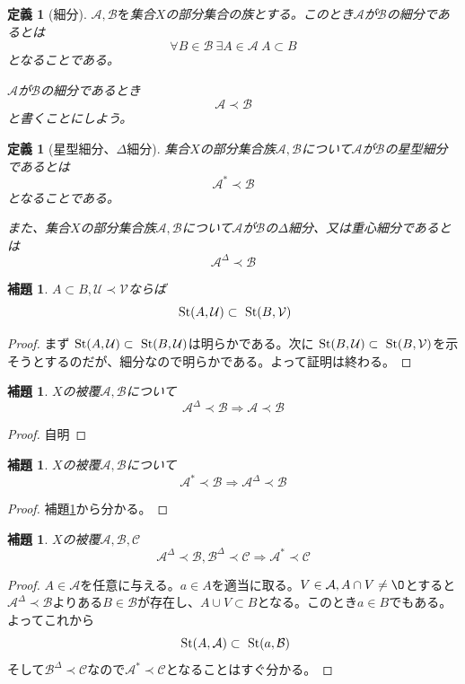 \documentclass[leqno]{jsarticle}
\newtheorem{lem}[thm]{補題}
\newtheorem{df}[thm]{定義}
\newcommand{\To}{\Longrightarrow}
\newcommand{\uu}{\mathcal{U}}
\newcommand{\vv}{\mathcal{V}}
\newcommand{\A}{\mathcal{A}}
\newcommand{\B}{\mathcal{B}}
\newcommand{\s}{\text{  {\rm St}} }
\newcommand{\C}{\mathcal{C}}
\newcommand{\dd}{\Delta}
\newcommand{\pr}{\prec}
\begin{document}
\begin{df}[細分]
$\mathcal{A},\mathcal{B}を$集合$X$の部分集合の族とする。このとき$\mathcal{A}$が$\mathcal{B}$の細分であるとは
\[
\forall B\in \mathcal{B}\ \exists A\in \mathcal{A}\ A\subset B
\]
となることである。\par
$\A$が$\B$の細分であるとき
\[
\A\pr \B
\]
と書くことにしよう。
\end{df}


\begin{df}[星型細分、$\Delta$細分]
集合$X$の部分集合族$\mathcal{A},\B$について$\A$が$\B$の星型細分であるとは
\[
\A^{*}\pr \B
\]
となることである。\par
また、集合$X$の部分集合族$\mathcal{A},\B$について$\mathcal{A}$が$\B$の$\Delta$細分、又は重心細分であるとは
\[
\A^{\dd}\pr\B
\]
\end{df}

\begin{lem}\label{benri}
$A\subset B,\uu\pr \mathcal{V}$ならば
\[
\s(A,\uu)\subset \s(B,\mathcal{V})
\]
\end{lem}
\begin{proof}
まず$\s(A,\uu)\subset \s(B,\uu)$は明らかである。次に$\s(B,\uu)\subset \s(B,\vv)$を示そうとするのだが、細分なので明らかである。よって証明は終わる。
\end{proof}


\begin{lem}\label{aaa}$X$の被覆$\A,\B$について
\[
\A^{\dd}\pr \B\To \A\pr\B
\]
\end{lem}
\begin{proof}
自明
\end{proof}




\begin{lem}\label{aaa}$X$の被覆$\A,\B$について
\[
\A^{*}\pr \B\To \A^{\dd}\pr\B
\]
\end{lem}
\begin{proof}
補題\ref{benri}から分かる。
\end{proof}

\begin{lem}\label{bebe}$X$の被覆$\A,\B,\C$
\[
\A^{\dd}\pr\B,\B^{\dd}\pr\C\To \A^{*}\pr\C
\]
\end{lem}
\begin{proof}
$A\in \A$を任意に与える。$a\in A$を適当に取る。$V\in \A,A\cap V\neq\O$とすると$\A^{\dd}\pr\B$よりある$B\in\B$が存在し、$A\cup V\subset B$となる。このとき$a\in B$でもある。よってこれから
\[
\s(A,\A)\subset \s(a,\B)
\]
そして$\B^{\dd}\pr \C$なので$\A^{*}\pr \C$となることはすぐ分かる。
\end{proof}
\end{document}

